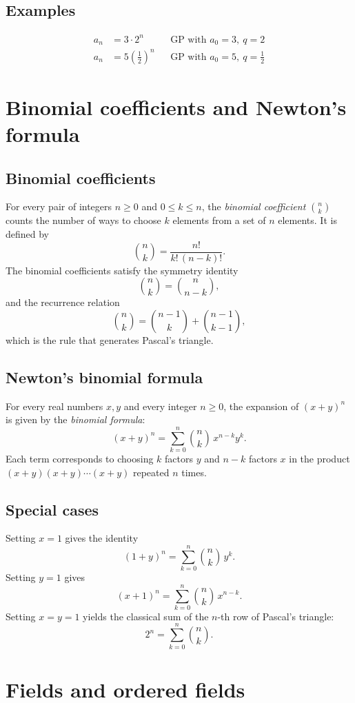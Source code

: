 \documentclass[11pt,a4paper]{article}
\theoremstyle{definition} \newtheorem{definition}{Definition} \theoremstyle{plain} \newtheorem{theorem}{Theorem}
\begin{document}
\subsection*{Examples}
\begin{equation*} \begin{aligned} a_n &= 3\cdot 2^n &&\text{GP with } a_0=3,\ q=2\\ a_n &= 5\left(\tfrac12\right)^n &&\text{GP with } a_0=5,\ q=\tfrac12 \end{aligned} \end{equation*}
\clearpage
\section{Binomial coefficients and Newton's formula}\label{sec:binomial}
\subsection{Binomial coefficients}
For every pair of integers $n\ge 0$ and $0\le k\le n$, the \emph{binomial coefficient} $\binom{n}{k}$ counts the number of ways to choose $k$ elements from a set of $n$ elements. It is defined by
\[\boxed{ \binom{n}{k} = \frac{n!}{k!\,(n-k)!}. }\]
The binomial coefficients satisfy the symmetry identity
\[\boxed{ \binom{n}{k} = \binom{n}{n-k}, }\]
and the recurrence relation
\[\boxed{ \binom{n}{k} = \binom{n-1}{k} + \binom{n-1}{k-1}, }\]
which is the rule that generates Pascal's triangle.
\subsection{Newton's binomial formula}
For every real numbers $x,y$ and every integer $n\ge 0$, the expansion of $(x+y)^n$ is given by the \emph{binomial formula}:
\[\boxed{ (x+y)^n = \sum_{k=0}^{n} \binom{n}{k}\, x^{n-k} y^{k}. }\]
Each term corresponds to choosing $k$ factors $y$ and $n-k$ factors $x$ in the product $(x+y)(x+y)\cdots(x+y)$ repeated $n$ times.
\subsection{Special cases}
Setting $x=1$ gives the identity
\[ (1+y)^n = \sum_{k=0}^{n} \binom{n}{k}\, y^{k}. \]
Setting $y=1$ gives
\[ (x+1)^n = \sum_{k=0}^{n} \binom{n}{k}\, x^{n-k}. \]
Setting $x=y=1$ yields the classical sum of the $n$-th row of Pascal's triangle:
\[ 2^n = \sum_{k=0}^{n} \binom{n}{k}. \]
\clearpage
\section{Fields and ordered fields}\label{sec:fields}
\end{document}

